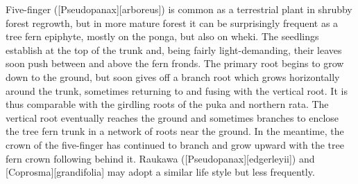 Five-finger ([Pseudopanax][arboreus]) is common as a terrestrial plant in shrubby forest regrowth, but in more mature forest it can be surprisingly frequent as a tree fern epiphyte, mostly on the ponga, but also on wheki.
The seedlings establish at the top of the trunk and, being fairly light-demanding, their leaves soon push between and above the fern fronds.
The primary root begins to grow down to the ground, but soon gives off a branch root which grows horizontally around the trunk, sometimes returning to and fusing with the vertical root.
It is thus comparable with the girdling roots of the puka and northern rata.
The vertical root eventually reaches the ground and sometimes branches to enclose the tree fern trunk in a network of roots near the ground.
In the meantime, the crown of the five-finger has continued to branch and grow upward with the tree fern crown following behind it.
Raukawa ([Pseudopanax][edgerleyii]) and [Coprosma][grandifolia] may adopt a similar life style but less frequently.

